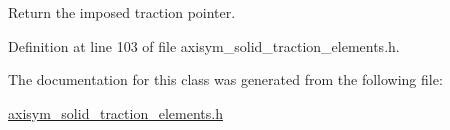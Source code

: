 Return the imposed traction pointer. 



Definition at line 103 of file axisym\+\_\+solid\+\_\+traction\+\_\+elements.\+h.



The documentation for this class was generated from the following file\+:\begin{DoxyCompactItemize}
\item 
\hyperlink{axisym__solid__traction__elements_8h}{axisym\+\_\+solid\+\_\+traction\+\_\+elements.\+h}\end{DoxyCompactItemize}
